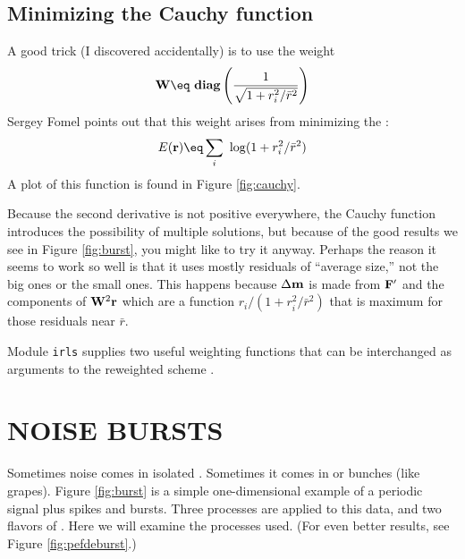 \subsection{Minimizing the Cauchy function}
A good trick
(I discovered accidentally) is to use the weight
\begin{equation}
\bold W \eq \ {\bf diag} \left(  {1\over{\sqrt{1+r_i^2/\bar r^2}}}  \right)
\label{eqn:cauchyweight}
\end{equation}
Sergey Fomel points out that this weight arises from
minimizing the :
\begin{equation}
E(\bold r) \eq \sum_i \ \log (1+r_i^2/\bar r^2)
\label{eqn:cauchypenalty}
\end{equation}
A plot of this function is found in Figure \ref{fig:cauchy}.

\par
Because the second derivative is not positive everywhere,
the Cauchy function introduces the possibility of multiple solutions,
but because of the good results we see in Figure \ref{fig:burst},
you might like to try it anyway.
Perhaps the reason it seems to work so well is that
it uses mostly residuals of ``average size,''
not the big ones or the small ones.
This happens because $\Delta\bold m$ is made from $\bold F'$ and
the components of $\bold W^2\bold r$  which are a function
$r_i/(1+r_i^2/\bar r^2)$
that is maximum for those residuals near
$\bar r$.
\par
Module \texttt{irls}  supplies two useful
weighting functions that can be interchanged as arguments to the
reweighted scheme .



\section{NOISE BURSTS}
Sometimes noise comes in isolated .
Sometimes it comes in  or bunches (like grapes).
Figure \ref{fig:burst} is a simple one-dimensional example
of a periodic signal plus spikes and bursts.
Three processes are applied to this data,
 and two flavors of .
Here we will examine the processes used.
(For even better results, see Figure \ref{fig:pefdeburst}.)

